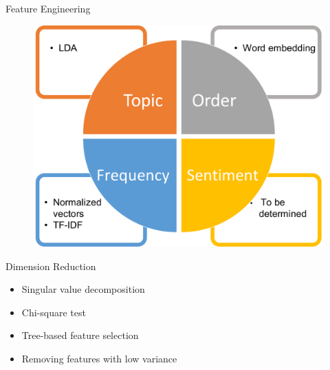 \documentclass[10pt]{beamer}
\begin{document}
\begin{frame}{Feature Engineering}
   \begin{figure}
    \centering
    \includegraphics[scale=0.35]{../image/feateng.pdf}
    
\end{figure}     
\end{frame}
\begin{frame}{Dimension Reduction}
\begin{itemize}
	\item Singular value decomposition
	\item Chi-square test
	\item Tree-based feature selection
	\item Removing features with low variance
\end{itemize}
\end{frame}
\end{document}
